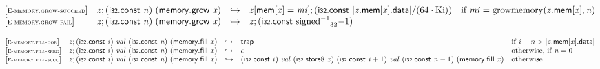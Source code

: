\vspace{1ex}

$$
\begin{array}{@{}l@{}lcl@{}l@{}}
{[\textsc{\scriptsize E{-}memory.grow{-}succeed}]} \quad & {\mathit{z}} ; (\mathsf{i{\scriptstyle32}}.\mathsf{const}~{\mathit{n}})~(\mathsf{memory.grow}~{\mathit{x}}) &\hookrightarrow& {\mathit{z}}[\mathsf{mem}[{\mathit{x}}] = {\mathit{mi}}] ; (\mathsf{i{\scriptstyle32}}.\mathsf{const}~{|{{\mathit{z}}.\mathsf{mem}}{[{\mathit{x}}]}.\mathsf{data}|} / (64 \cdot {\mathrm{Ki}})) &\quad
  \mbox{if}~{\mathit{mi}} = {\mathrm{growmemory}}({{\mathit{z}}.\mathsf{mem}}{[{\mathit{x}}]}, {\mathit{n}}) \\
{[\textsc{\scriptsize E{-}memory.grow{-}fail}]} \quad & {\mathit{z}} ; (\mathsf{i{\scriptstyle32}}.\mathsf{const}~{\mathit{n}})~(\mathsf{memory.grow}~{\mathit{x}}) &\hookrightarrow& {\mathit{z}} ; (\mathsf{i{\scriptstyle32}}.\mathsf{const}~{{{{{\mathrm{signed}}^{{-1}}}}{}}_{32}}{{-1}}) &  \\
\end{array}
$$

\vspace{1ex}

$$
\begin{array}{@{}l@{}lcl@{}l@{}}
{[\textsc{\scriptsize E{-}memory.fill{-}oob}]} \quad & {\mathit{z}} ; (\mathsf{i{\scriptstyle32}}.\mathsf{const}~{\mathit{i}})~{\mathit{val}}~(\mathsf{i{\scriptstyle32}}.\mathsf{const}~{\mathit{n}})~(\mathsf{memory.fill}~{\mathit{x}}) &\hookrightarrow& \mathsf{trap} &\quad
  \mbox{if}~{\mathit{i}} + {\mathit{n}} > {|{{\mathit{z}}.\mathsf{mem}}{[{\mathit{x}}]}.\mathsf{data}|} \\
{[\textsc{\scriptsize E{-}memory.fill{-}zero}]} \quad & {\mathit{z}} ; (\mathsf{i{\scriptstyle32}}.\mathsf{const}~{\mathit{i}})~{\mathit{val}}~(\mathsf{i{\scriptstyle32}}.\mathsf{const}~{\mathit{n}})~(\mathsf{memory.fill}~{\mathit{x}}) &\hookrightarrow& \epsilon &\quad
  \mbox{otherwise, if}~{\mathit{n}} = 0 \\
{[\textsc{\scriptsize E{-}memory.fill{-}succ}]} \quad & {\mathit{z}} ; (\mathsf{i{\scriptstyle32}}.\mathsf{const}~{\mathit{i}})~{\mathit{val}}~(\mathsf{i{\scriptstyle32}}.\mathsf{const}~{\mathit{n}})~(\mathsf{memory.fill}~{\mathit{x}}) &\hookrightarrow& (\mathsf{i{\scriptstyle32}}.\mathsf{const}~{\mathit{i}})~{\mathit{val}}~({\mathsf{i{\scriptstyle32}}.\mathsf{store}}{8}~{\mathit{x}})~(\mathsf{i{\scriptstyle32}}.\mathsf{const}~{\mathit{i}} + 1)~{\mathit{val}}~(\mathsf{i{\scriptstyle32}}.\mathsf{const}~{\mathit{n}} - 1)~(\mathsf{memory.fill}~{\mathit{x}}) &\quad
  \mbox{otherwise} \\
\end{array}
$$


